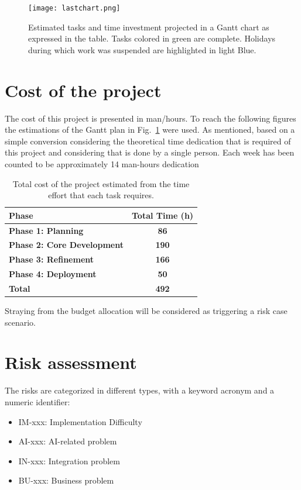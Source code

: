 \documentclass[a4paper, 11pt]{report}
\begin{document}
\begin{figure}[ht!]
    \centering
    \texttt{[image: lastchart.png]}
    \caption[Estimated time investment per task]{Estimated tasks and time investment projected in a Gantt chart as expressed in the table. Tasks colored in green are complete. Holidays during which work was suspended are highlighted in light Blue.}
    \label{fig:Gantt_plan}
\end{figure}


\section{Cost of the project}
The cost of this project is presented in man/hours. To reach the following figures the estimations of the Gantt plan in Fig.~\ref{fig:Gantt_plan} were used. As mentioned, based on a simple conversion considering the theoretical time dedication that is required of this project and considering that is done by a single person. Each week has been counted to be approximately 14 man-hours dedication

\begin{table}[ht!]
\centering
\begin{tabular}{|l|c|}
\hline
\textbf{Phase} & \textbf{Total Time (h)}  \\
\hline \hline
\textbf{Phase 1: Planning}  & \textbf{86}  \\
\hline \hline
\textbf{Phase 2: Core Development}  & \textbf{190}  \\
\hline \hline
\textbf{Phase 3: Refinement} & \textbf{166}\\
\hline \hline
\textbf{Phase 4: Deployment}  & \textbf{50}  \\
\hline \hline
\textbf{Total} & \textbf{492} \\
\hline
\end{tabular}
\caption{Total cost of the project estimated from the time effort that each task requires.}
\label{Tab:Budget}
\end{table}

Straying from the budget allocation will be considered as triggering a risk case scenario.
\clearpage
\section{Risk assessment}
The risks are categorized in different types, with a keyword acronym and a numeric identifier:

\begin{itemize}
    \item IM-xxx: Implementation Difficulty
    \item AI-xxx: AI-related problem
    \item IN-xxx: Integration problem
    \item BU-xxx: Business problem
\end{itemize}
\end{document}
